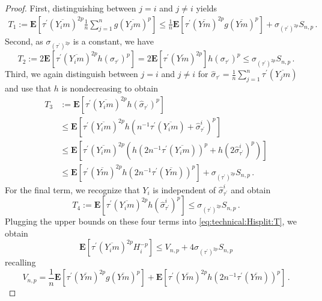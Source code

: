 \documentclass[10pt,a4paper]{amsart}
\newcommand{\E}{\mathbf{E}} %
\newcommand{\EOf}[1]{\E\abOf{#1}}
\newcommand{\ab}[1]{\lab #1 \rab} %
\newcommand{\abOf}[1]{\!\ab{#1}} %
\newcommand{\br}[1]{\lb #1 \rb} %
\newcommand{\dtran}{\tau\pr}
\newcommand{\eqfs}{\,.}
\newcommand{\lab}{\left[} %
\newcommand{\lb}{\left(} %
\newcommand{\ol}[2]{\overline{#1#2}}
\newcommand{\pr}{^\prime}
\newcommand{\rab}{\right]} %
\newcommand{\rb}{\right)} %
\begin{document}
\begin{proof}
    First, distinguishing between $j=i$ and $j\neq i$ yields
    \begin{align}
        T_1 
        := 
        \EOf{\dtran(\ol{Y_i}m)^{2p} \frac1n \sum_{j=1}^n g(\ol{Y_j}{m})^p} 
        \leq
        \frac1n  \EOf{\dtran(\ol{Y}m)^{2p} g(\ol{Y}{m})^p} + \sigma_{(\dtran)^{2p}} S_{n,p}
        \eqfs
    \end{align}
    Second, as $\sigma_{(\dtran)^{2p}}$ is a constant, we have
    \begin{equation}
        T_2 
        := 
        2\EOf{\dtran(\ol{Y_i}m)^{2p} h(\sigma_{\dtran})^p} 
        =
        2\EOf{\dtran(\ol{Y}m)^{2p}} h(\sigma_{\dtran})^p
        \leq
        \sigma_{(\dtran)^{2p}} S_{n,p}
        \eqfs
    \end{equation}
    Third, we again distinguish between $j=i$ and $j\neq i$ for $\hat\sigma_{\dtran} = \frac1n\sum_{j=1}^n \dtran(\ol {Y_j}m)$ and use that $h$ is nondecreasing to obtain
    \begin{align}
        T_3 
        &:= 
        \EOf{\dtran(\ol{Y_i}m)^{2p} h(\hat\sigma_{\dtran})^p} 
        \\& \leq
        \EOf{\dtran(\ol{Y_i}m)^{2p} h(n^{-1} \dtran(\ol{Y_i}m)+\hat\sigma^i_{\dtran})^p} 
        \\& \leq
        \EOf{\dtran(\ol{Y_i}m)^{2p} \br{h(2n^{-1} \dtran(\ol{Y_i}m))^p+h(2\hat\sigma^i_{\dtran})^p} }
        \\&\leq
        \EOf{\dtran(\ol{Y}m)^{2p} h(2n^{-1} \dtran(\ol{Y}m))^p} + \sigma_{(\dtran)^{2p}} S_{n,p}
        \eqfs
    \end{align}
    For the final term, we recognize that $Y_i$ is independent of $\hat\sigma^i_{\dtran}$ and obtain
    \begin{equation}
        T_4 
        := 
        \EOf{\dtran(\ol{Y_i}m)^{2p} h(\hat\sigma^i_{\dtran})^p} 
        \leq
        \sigma_{(\dtran)^{2p}} S_{n,p}
        \eqfs
    \end{equation}
    Plugging the upper bounds on these four terms into \eqref{eq:technical:Hisplit:T}, we obtain
    \begin{equation}\label{eq:technical:Hipbound}
        \EOf{\dtran(\ol{Y_i}m)^{2p} H_i^{-p}} \leq V_{n,p} + 4 \sigma_{(\dtran)^{2p}} S_{n,p}
    \end{equation}
    recalling
    \begin{equation}
        V_{n,p} = \frac1n  \EOf{\dtran(\ol{Y}m)^{2p} g(\ol{Y}{m})^p}  + 	\EOf{\dtran(\ol{Y}m)^{2p} h(2n^{-1} \dtran(\ol{Y}m))^p}\eqfs
    \end{equation}

\end{proof}
\end{document}
